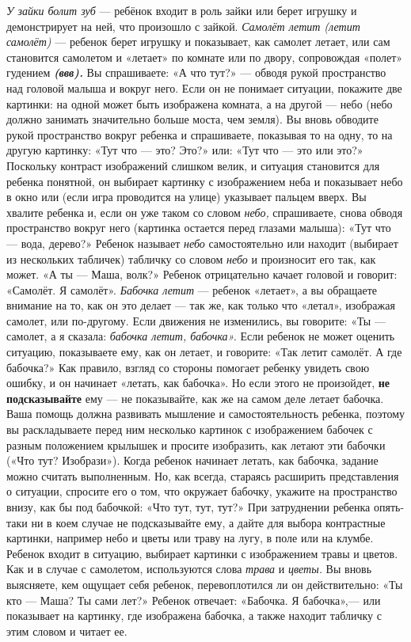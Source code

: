 \documentclass[a5paper]{book}
\renewcommand{\emph}[1]{\textit{#1}}
\begin{document}
\emph{У зайки болит зуб} --- ребёнок входит в роль зайки или берет
игрушку и демонстрирует на ней, что произошло с зайкой. \emph{Самолёт
летит (летит самолёт)} --- ребенок берет игрушку и показывает, как
самолет летает, или сам становится самолетом и «летает» по комнате или
по двору, сопровождая «полет» гудением \emph{\textbf{(ввв).}} Вы
спрашиваете: «А что тут?» --- обводя рукой пространство над головой
малыша и вокруг него. Если он не понимает ситуации, покажите две
картинки: на одной может быть изображена комната, а на другой --- небо
(небо должно занимать значительно больше моста, чем земля). Вы вновь
обводите рукой пространство вокруг ребенка и спрашиваете, показывая то
на одну, то на другую картинку: «Тут что --- это? Это?» или: «Тут что
--- это или это?» Поскольку контраст изображений слишком велик, и
ситуация становится для ребенка понятной, он выбирает картинку с
изображением неба и показывает небо в окно или (если игра проводится на
улице) указывает пальцем вверх. Вы хвалите ребенка и, если он уже таком
со словом \emph{небо,} спрашиваете, снова обводя пространство вокруг
него (картинка остается перед глазами малыша): «Тут что --- вода,
дерево?» Ребенок называет \emph{небо} самостоятельно или находит
(выбирает из нескольких табличек) табличку со словом \emph{небо} и
произносит его так, как может. «А ты --- Маша, волк?» Ребенок
отрицательно качает головой и говорит: «Самолёт. Я самолёт».
\emph{Бабочка летит} --- ребенок «летает», а вы обращаете внимание на
то, как он это делает --- так же, как только что «летал», изображая
самолет, или по-другому. Если движения не изменились, вы говорите: «Ты
--- самолет, а я сказала: \emph{бабочка летит, бабочка».} Если ребенок
не может оценить ситуацию, показываете ему, как он летает, и говорите:
«Так летит самолёт. А где бабочка?» Как правило, взгляд со стороны
помогает ребенку увидеть свою ошибку, и он начинает «летать, как
бабочка». Но если этого не произойдет, \textbf{не подсказывайте} ему ---
не показывайте, как же на самом деле летает бабочка. Ваша помощь должна
развивать мышление и самостоятельность ребенка, поэтому вы раскладываете
перед ним несколько картинок с изображением бабочек с разным положением
крылышек и просите изобразить, как летают эти бабочки («Что тут?
Изобрази»). Когда ребенок начинает летать, как бабочка, задание можно
считать выполненным. Но, как всегда, стараясь расширить представления о
ситуации, спросите его о том, что окружает бабочку, укажите на
пространство внизу, как бы под бабочкой: «Что тут, тут, тут?» При
затруднении ребенка опять-таки ни в коем случае не подсказывайте ему, а
дайте для выбора контрастные картинки, например небо и цветы или траву
на лугу, в поле или на клумбе. Ребенок входит в ситуацию, выбирает
картинки с изображением травы и цветов. Как и в случае с самолетом,
используются слова \emph{трава} и \emph{цветы.} Вы вновь выясняете, кем
ощущает себя ребенок, перевоплотился ли он действительно: «Ты кто ---
Маша? Ты сами лет?» Ребенок отвечает: «Бабочка. Я бабочка»,--- или
показывает на картинку, где изображена бабочка, а также находит табличку
с этим словом и читает ее.
\end{document}
